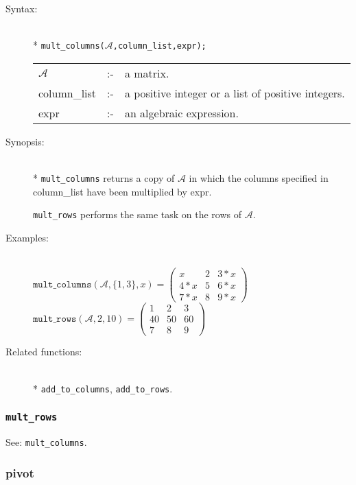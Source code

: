 \begin{description}
\item[Syntax:]\mbox{}\\*
\texttt{mult\_columns($\mathcal{A}$,column\_list,expr);}\\[2mm]
\begin{tabular}{l l l}
$\mathcal{A}$   &:-& a matrix. \\
column\_list &:-& a positive integer or a list of positive integers. \\
expr        &:-& an algebraic expression.
\end{tabular}

\item[Synopsis:]\mbox{}\\*
\texttt{mult\_columns} returns a copy of $\mathcal{A}$ in which
                the columns specified in column\_list have been
multiplied by expr.

\texttt{mult\_rows} performs the same task on the rows of $\mathcal{A}$.

\item[Examples:]\mbox{}\\
  \(\texttt{mult\_columns}(\mathcal{A},\{1,3\},x)  =
  \begin{pmatrix} x & 2 & 3*x \\ 4*x & 5 & 6*x \\ 7*x & 8 & 9*x \end{pmatrix}\) \\[2mm]
  \(\texttt{mult\_rows}(\mathcal{A},2,10)  =
  \begin{pmatrix} 1 & 2 & 3 \\ 40 & 50 & 60 \\ 7 & 8 & 9 \end{pmatrix}\)

\item[Related functions:]\mbox{}\\*
\texttt{add\_to\_columns}, \texttt{add\_to\_rows}.
\end{description}


\subsubsection{\texttt{mult\_rows}}
\label{linalg:mult_rows}
See: \texttt{mult\_columns}.


\subsubsection{pivot}
\label{linalg:pivot}


